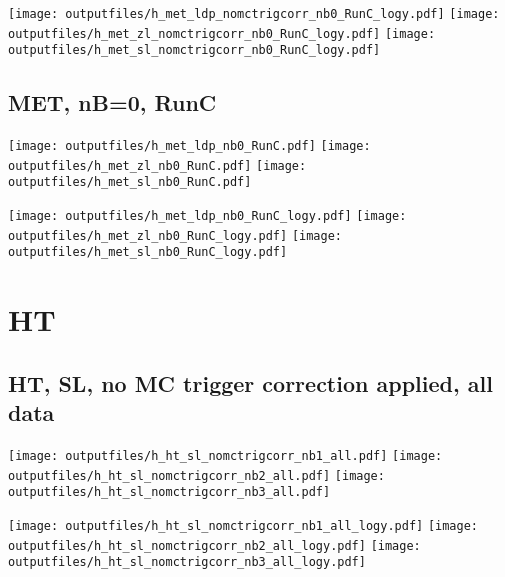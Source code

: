 \documentclass[11pt]{article}
\begin{document}
    \noindent
    \texttt{[image: outputfiles/h\_met\_ldp\_nomctrigcorr\_nb0\_RunC\_logy.pdf]}
    \texttt{[image: outputfiles/h\_met\_zl\_nomctrigcorr\_nb0\_RunC\_logy.pdf]}
    \texttt{[image: outputfiles/h\_met\_sl\_nomctrigcorr\_nb0\_RunC\_logy.pdf]}


    \subsection{ MET, nB=0, RunC}

    \noindent
    \texttt{[image: outputfiles/h\_met\_ldp\_nb0\_RunC.pdf]}
    \texttt{[image: outputfiles/h\_met\_zl\_nb0\_RunC.pdf]}
    \texttt{[image: outputfiles/h\_met\_sl\_nb0\_RunC.pdf]}

    \noindent
    \texttt{[image: outputfiles/h\_met\_ldp\_nb0\_RunC\_logy.pdf]}
    \texttt{[image: outputfiles/h\_met\_zl\_nb0\_RunC\_logy.pdf]}
    \texttt{[image: outputfiles/h\_met\_sl\_nb0\_RunC\_logy.pdf]}









   \section{HT}
     \subsection{ HT, SL, no MC trigger correction applied, all data}

    \noindent
     \texttt{[image: outputfiles/h\_ht\_sl\_nomctrigcorr\_nb1\_all.pdf]}
     \texttt{[image: outputfiles/h\_ht\_sl\_nomctrigcorr\_nb2\_all.pdf]}
     \texttt{[image: outputfiles/h\_ht\_sl\_nomctrigcorr\_nb3\_all.pdf]}

    \noindent
     \texttt{[image: outputfiles/h\_ht\_sl\_nomctrigcorr\_nb1\_all\_logy.pdf]}
     \texttt{[image: outputfiles/h\_ht\_sl\_nomctrigcorr\_nb2\_all\_logy.pdf]}
     \texttt{[image: outputfiles/h\_ht\_sl\_nomctrigcorr\_nb3\_all\_logy.pdf]}
\end{document}
